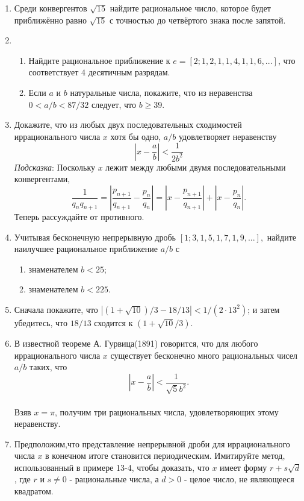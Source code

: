 \documentclass[11pt]{article}
\begin{document}
\begin{enumerate}
\item Среди конвергентов $\sqrt{15}$ найдите рациональное число, которое будет приближённо равно $\sqrt{15}$ с точностью до четвёртого знака после запятой. 

\item 
\begin{enumerate}
\item Найдите рациональное приближение к $e=[2;1,2,1,1,4,1,1,6,...]$, что соответствует $4$ десятичным разрядам.
\item Если $a$ и $b$ натуральные числа, покажите, что из неравенства $0<a/b<87/32$ следует, что $b\geq39$.
\end{enumerate}

\item Докажите, что из любых двух последовательных сходимостей иррационального числа $x$ хотя бы одно, $a/b$ удовлетворяет неравенству \[|x-\frac{a}{b}|<\frac{1}{2b^{2}}\] \textit{Подсказка}: Поскольку $x$ лежит между любыми двумя последовательными конвергентами, \[\frac{1}{q_{n}q_{n+1}}=|\frac{p_{n+1}}{q_{n+1}}-\frac{p_{n}}{q_{n}}|=|x-\frac{p_{n+1}}{q_{n+1}}|+|x-\frac{p_{n}}{q_{n}}|.\] Теперь рассуждайте от противного.

\item Учитывая бесконечную непрерывную дробь $[1;3,1,5,1,7,1,9,...],$ найдите наилучшее рациональное приближение $a/b$ с 
\begin{enumerate}
\item знаменателем $b<25;$ 
\item знаменателем $b<225.$
\end{enumerate}
	
\item Сначала покажите, что $|(1+\sqrt{10})/3-18/13|<1/(2\cdot13^{2})$; и затем убедитесь, что $18/13$ сходится к $(1+\sqrt{10}/3)$.

\item В известной теореме А. Гурвица(1891) говорится, что для любого иррационального числа $x$ существует бесконечно много рациональных чисел $a/b$ таких, что \[|x-\frac{a}{b}|<\frac{1}{\sqrt{5}b^{2}}.\] \\ Взяв $x=\pi$, получим три рациональных числа, удовлетворяющих этому неравенству.

\item Предположим,что представление непрерывной дроби для иррационального числа $x$ в конечном итоге становится периодическим. Имитируйте метод, использованный в примере 13-4,  чтобы доказать, что $x$ имеет форму $r+s\sqrt{d}$, где $r$ и $s\neq0$ - рациональные числа, а $d>0$ - целое число, не являющееся квадратом.


\end{enumerate}
\end{document}
